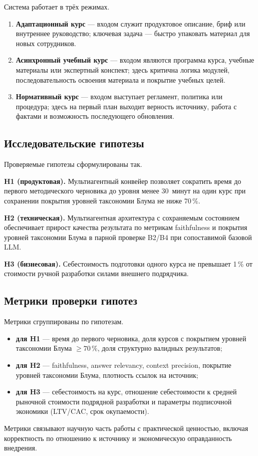 Система работает в трёх режимах.

\begin{enumerate}
  \item \textbf{Адаптационный курс} — входом служит продуктовое описание,
    бриф или внутреннее руководство; ключевая задача — быстро упаковать
    материал для новых сотрудников.
  \item \textbf{Асинхронный учебный курс} — входом являются программа
    курса, учебные материалы или экспертный конспект; здесь критична
    логика модулей, последовательность освоения материала и покрытие учебных целей.
  \item \textbf{Нормативный курс} — входом выступает регламент,
    политика или процедура; здесь на первый план выходит верность
    источнику, работа с фактами и возможность последующего обновления.
\end{enumerate}

\subsection{Исследовательские гипотезы}

Проверяемые гипотезы сформулированы так.

\textbf{H1 (продуктовая).} Мультиагентный конвейер позволяет сократить
время до первого методического черновика до уровня менее 30~минут
на один курс
при сохранении покрытия уровней таксономии Блума не ниже 70\,\%.

\textbf{H2 (техническая).} Мультиагентная архитектура с сохраняемым состоянием
обеспечивает прирост качества результата по метрикам
faithfulness и покрытия уровней таксономии Блума в парной проверке B2/B4
при сопоставимой базовой LLM.

\textbf{H3 (бизнесовая).} Себестоимость подготовки одного курса
не превышает 1\,\% от стоимости ручной разработки силами внешнего
подрядчика.

\subsection{Метрики проверки гипотез}

Метрики сгруппированы по гипотезам.

\begin{itemize}
  \item \textbf{для H1} — время до первого черновика, доля курсов
    с покрытием уровней таксономии Блума
    $\geq 70\,\%$, доля структурно валидных результатов;
  \item \textbf{для H2} — faithfulness, answer relevancy,
    context precision, покрытие уровней таксономии Блума,
    плотность ссылок на источник;
  \item \textbf{для H3} — себестоимость на курс, отношение себестоимости
    к средней рыночной стоимости подрядной разработки и
    параметры подписочной экономики (LTV/CAC, срок окупаемости).
\end{itemize}

Метрики связывают научную часть работы
с практической ценностью, включая корректность по отношению
к источнику и экономическую оправданность внедрения.
